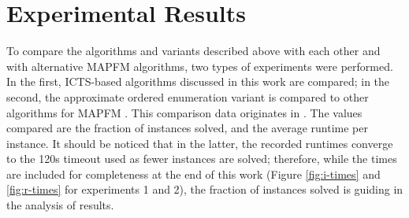 \documentclass[english]{article}
\begin{document}
	\section{Experimental Results}
	\label{experiments}
	To compare the algorithms and variants described above with each other and with alternative MAPFM algorithms, two types of experiments were performed. In the first, ICTS-based algorithms discussed in this work are compared; in the second, the approximate ordered enumeration variant is compared to other algorithms for MAPFM \cite{donszelmann2021,baauw2021,jong2021,bruin2021}. This comparison data originates in \cite{donszelmann2021}. The values compared are the fraction of instances solved, and the average runtime per instance. It should be noticed that in the latter, the recorded runtimes converge to the 120s timeout used as fewer instances are solved; therefore, while the times are included for completeness at the end of this work (Figure \ref{fig:i-times} and \ref{fig:r-times} for experiments 1 and 2), the fraction of instances solved is guiding in the analysis of results.
\end{document}
